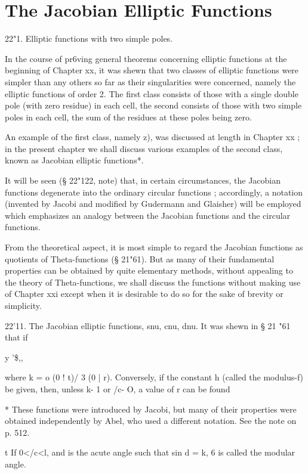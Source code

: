 \chapter{The Jacobian Elliptic Functions} 

22"1. Elliptic functions with two simple poles.

In the course of pr6ving general theorems concerning elliptic
functions at the beginning of Chapter xx, it was shewn that two
classes of elliptic functions were simpler than any others so far as
their singularities were concerned, namely the elliptic functions of
order 2. The first class consists of those with a single double pole
(with zero residue) in each cell, the second consists of those with
two simple poles in each cell, the sum of the residues at these poles
being zero.

An example of the first class, namely z), was discussed at length in
Chapter xx ; in the present chapter we shall discuss various examples
of the second class, known as Jacobian elliptic functions*.

It will be seen (§ 22"122, note) that, in certain circumstances, the
Jacobian functions degenerate into the ordinary circular functions ;
accordingly, a notation (invented by Jacobi and modified by Gudermann
and Glaisher) will be employed which emphasizes an analogy between the
Jacobian functions and the circular functions.

From the theoretical aspect, it is most simple to regard the Jacobian
functions as quotients of Theta-functions (§ 21"61). But as many of
their fundamental properties can be obtained by quite elementary
methods, without appealing to the theory of Theta-functions, we shall
discuss the functions without making use of Chapter xxi except when it
is desirable to do so for the sake of brevity or simplicity.

22'11. The Jacobian elliptic functions, snu, cnu, dnu. It was shewn in
§ 21 "61 that if

y '\$,,%

where k = o (0 ! t)/ 3 (0 | r). Conversely, if the constant h (called
the modulus-f) be given, then, unless k- 1 or /c- O, a value of r can
be found

* These functions were introduced by Jacobi, but many of their
properties were obtained independently by Abel, who used a different
notation. See the note on p. 512.

t If 0</c<l, and is the acute angle such that sin d = k, 6 is called
the modular angle.



